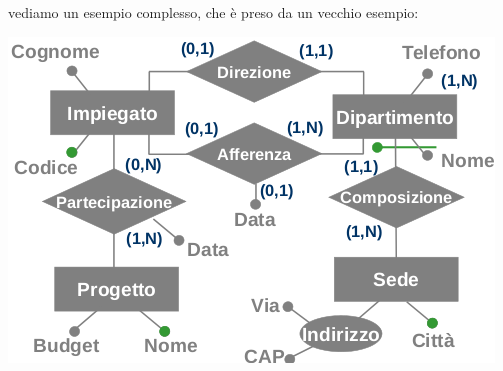 \documentclass[a4paper,12pt, oneside]{book}
\begin{document}
vediamo un esempio complesso, che è preso da un vecchio esempio:
\begin{center}
\includegraphics[scale=0.8]{img/er14.png}
\end{center}
\end{document}
